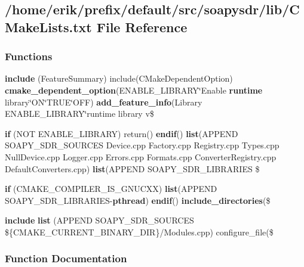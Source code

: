 \subsection{/home/erik/prefix/default/src/soapysdr/lib/\+C\+Make\+Lists.txt File Reference}
\label{soapysdr_2lib_2CMakeLists_8txt}
\subsubsection*{Functions}
\begin{DoxyCompactItemize}
\item 
{\bf include} (Feature\+Summary) include(C\+Make\+Dependent\+Option) {\bf cmake\+\_\+dependent\+\_\+option}(E\+N\+A\+B\+L\+E\+\_\+\+L\+I\+B\+R\+A\+RY\char`\"{}Enable {\bf runtime} library\char`\"{}ON\char`\"{}T\+R\+UE\char`\"{}O\+FF) {\bf add\+\_\+feature\+\_\+info}(Library E\+N\+A\+B\+L\+E\+\_\+\+L\+I\+B\+R\+A\+RY\char`\"{}runtime library v\$
\item 
{\bf if} (N\+OT E\+N\+A\+B\+L\+E\+\_\+\+L\+I\+B\+R\+A\+RY) return() {\bf endif}() {\bf list}(A\+P\+P\+E\+ND S\+O\+A\+P\+Y\+\_\+\+S\+D\+R\+\_\+\+S\+O\+U\+R\+C\+ES Device.\+cpp Factory.\+cpp Registry.\+cpp Types.\+cpp Null\+Device.\+cpp Logger.\+cpp Errors.\+cpp Formats.\+cpp Converter\+Registry.\+cpp Default\+Converters.\+cpp) {\bf list}(A\+P\+P\+E\+ND S\+O\+A\+P\+Y\+\_\+\+S\+D\+R\+\_\+\+L\+I\+B\+R\+A\+R\+I\+ES \$
\item 
{\bf if} (C\+M\+A\+K\+E\+\_\+\+C\+O\+M\+P\+I\+L\+E\+R\+\_\+\+I\+S\+\_\+\+G\+N\+U\+C\+XX) {\bf list}(A\+P\+P\+E\+ND S\+O\+A\+P\+Y\+\_\+\+S\+D\+R\+\_\+\+L\+I\+B\+R\+A\+R\+I\+ES-\/{\bf pthread}) {\bf endif}() {\bf include\+\_\+directories}(\$
\item 
{\bf include} {\bf list} (A\+P\+P\+E\+ND S\+O\+A\+P\+Y\+\_\+\+S\+D\+R\+\_\+\+S\+O\+U\+R\+C\+ES \$\{C\+M\+A\+K\+E\+\_\+\+C\+U\+R\+R\+E\+N\+T\+\_\+\+B\+I\+N\+A\+R\+Y\+\_\+\+D\+IR\}/Modules.\+cpp) configure\+\_\+file(\$
\end{DoxyCompactItemize}


\subsubsection{Function Documentation}
